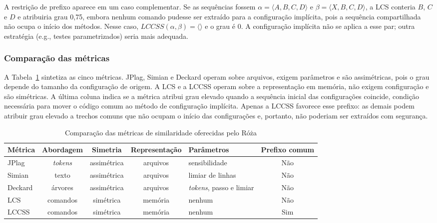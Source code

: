A restrição de prefixo aparece em um caso complementar. Se as sequências fossem $\alpha=\langle A,B,C,D\rangle$ e $\beta=\langle X,B,C,D\rangle$, a LCS conteria $B$, $C$ e $D$ e atribuiria grau 0,75, embora nenhum comando pudesse ser extraído para a configuração implícita, pois a sequência compartilhada não ocupa o início dos métodos. Nesse caso, $LCCSS(\alpha,\beta)=\langle\rangle$ e o grau é 0. A configuração implícita não se aplica a esse par; outra estratégia (e.g., testes parametrizados) seria mais adequada.

\subsubsection{Comparação das métricas}

A Tabela~\ref{table:similarity-metrics} sintetiza as cinco métricas. JPlag, Simian e Deckard operam sobre arquivos, exigem parâmetros e são assimétricas, pois o grau depende do tamanho da configuração de origem. A LCS e a LCCSS operam sobre a representação em memória, não exigem configuração e são simétricas. A última coluna indica se a métrica atribui grau elevado quando a sequência inicial das configurações coincide, condição necessária para mover o código comum ao método de configuração implícita. Apenas a LCCSS favorece esse prefixo: as demais podem atribuir grau elevado a trechos comuns que não ocupam o início das configurações e, portanto, não poderiam ser extraídos com segurança.

\begin{table}[htb]
	\centering
	\caption{Comparação das métricas de similaridade oferecidas pelo Róża}
	\label{table:similarity-metrics}
	\small
	\begin{tabular}{lccc>{\raggedright\arraybackslash}p{3.4cm}c}
		\hline
		Métrica & Abordagem & Simetria & Representação & Parâmetros & Prefixo comum \\
		\hline
		JPlag & \textit{tokens} & assimétrica & arquivos & sensibilidade & Não \\
		Simian & texto & assimétrica & arquivos & limiar de linhas & Não \\
		Deckard & árvores & assimétrica & arquivos & \textit{tokens}, passo e limiar & Não \\
		LCS & comandos & simétrica & memória & nenhum & Não \\
		LCCSS & comandos & simétrica & memória & nenhum & Sim \\
		\hline
	\end{tabular}
\end{table}

